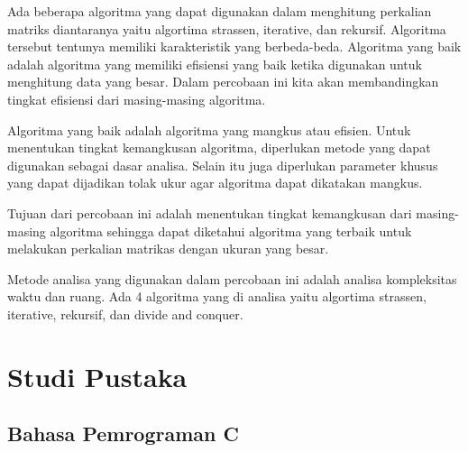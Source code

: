 \documentclass[conference]{IEEEtran}
\begin{document}
Ada beberapa algoritma yang dapat digunakan dalam menghitung perkalian matriks diantaranya yaitu algortima strassen, iterative, dan rekursif. Algoritma tersebut tentunya memiliki karakteristik yang berbeda-beda. Algoritma yang baik adalah algoritma yang memiliki efisiensi yang baik ketika digunakan untuk menghitung data yang besar. Dalam percobaan ini kita akan membandingkan tingkat efisiensi dari masing-masing algoritma. 

Algoritma yang baik adalah algoritma yang mangkus atau efisien. Untuk menentukan tingkat kemangkusan algoritma, diperlukan metode yang dapat digunakan sebagai dasar analisa. Selain itu juga diperlukan parameter khusus yang dapat dijadikan tolak ukur agar algoritma dapat dikatakan mangkus. 

Tujuan dari percobaan ini adalah menentukan tingkat kemangkusan dari masing-masing algoritma sehingga dapat diketahui algoritma yang terbaik untuk melakukan perkalian matrikas dengan ukuran yang besar.

Metode analisa yang digunakan dalam percobaan ini adalah analisa kompleksitas waktu dan ruang. Ada 4 algoritma yang di analisa yaitu algortima strassen, iterative, rekursif, dan divide and conquer.

\section{Studi Pustaka}

\subsection{Bahasa Pemrograman C}
\end{document}
